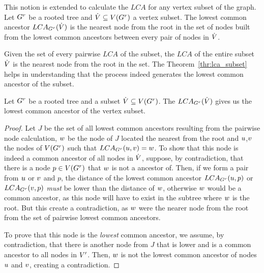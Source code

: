 \documentclass[msc]{ppgccufmg}    %
\begin{document}

This notion is extended to calculate the $LCA$ for any vertex subset of the 
graph. 
Let $G^{r}$ be a rooted tree and $\dot{V} \subseteq V(G^{r})$ a 
vertex subset. 
The lowest common ancestor $LCA_{G^{r}}(\dot{V})$ is the nearest node from 
the root in the set of nodes built from the lowest common ancestors between 
every pair of nodes in $\dot{V}$.

Given the set of every pairwise $LCA$ of the subset, the $LCA$ of the entire 
subset $\dot{V}$ is the nearest node from the root in the set.
The Theorem~\ref{thr:lca_subset} helps in understanding that the process indeed 
generates the lowest common ancestor of the subset.

\begin{theorem}
\label{thr:lca_subset}
Let $G^{r}$ be a rooted tree and a subset $\dot{V} \subseteq 
V(G^{r})$. 
The $LCA_{G^{r}}(\dot{V})$ gives us the lowest common ancestor of the vertex 
subset.
\end{theorem}

\begin{proof}
Let $J$ be the set of all lowest common ancestors resulting from the pairwise
node calculation, $w$ be the node of $J$ located the nearest from
the root and $u$,$v$ the nodes of $V(G^{r})$ such that
$LCA_{G^{r}}(u,v) = w$.
To show that this node is indeed a common ancestor of all nodes in 
$\dot{V}$, suppose, by contradiction, that there is a node $p \in 
V(G^{r})$ that $w$ is not a ancestor of.
Then, if we form a pair from $u$ or $v$ and $p$, the distance of 
the lowest common ancestor $LCA_{G^{r}}(u, p)$ or $LCA_{G^{r}}(v, p)$ 
\textit{must} be lower than the distance of $w$, otherwise $w$ 
would be a common ancestor, as this node will have to exist in the subtree where 
$w$ is the root.
But this create a contradiction, as $w$ were the nearer node from the 
root from the set of pairwise lowest common ancestors.

To prove that this node is the \textit{lowest} common ancestor, we assume, by
contradiction, that there is another node from $J$ that is lower and is a common
ancestor to all nodes in $V'$.
Then, $w$ is not the lowest common ancestor of nodes $u$ and 
$v$, creating a contradiction.
\end{proof}
\end{document}
